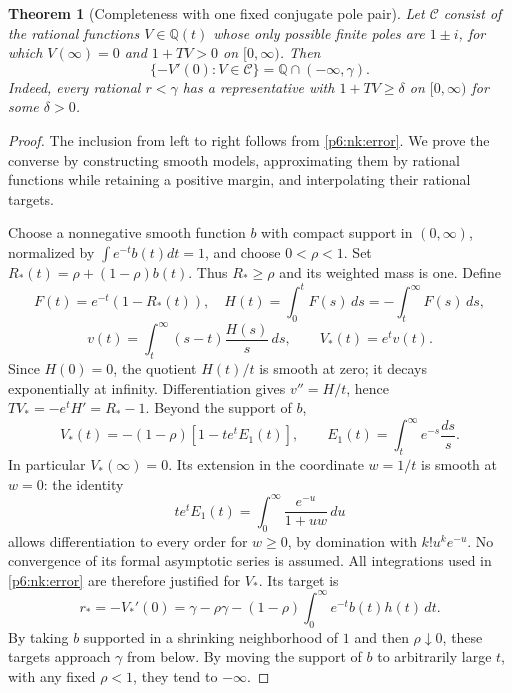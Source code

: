 \documentclass[11pt,a4paper]{article}
\newtheorem{theorem}{Theorem}[section]
\theoremstyle{definition}
\theoremstyle{remark}
\numberwithin{equation}{section}
\begin{document}
\begin{theorem}[Completeness with one fixed conjugate pole pair]
\label{p6:nk:complete}
Let $\mathcal C$ consist of the rational functions $V\in\mathbb Q(t)$
whose only possible finite poles are $1\pm i$, for which $V(\infty)=0$
and $1+TV>0$ on $[0,\infty)$. Then
\[
 \boxed{\{-V'(0):V\in\mathcal C\}=\mathbb Q\cap(-\infty,\gamma).}
\]
Indeed, every rational $r<\gamma$ has a representative with
$1+TV\geq\delta$ on $[0,\infty)$ for some $\delta>0$.
\end{theorem}
\begin{proof}
The inclusion from left to right follows from \eqref{p6:nk:error}. We prove
the converse by constructing smooth models, approximating them by rational
functions while retaining a positive margin, and interpolating their
rational targets.

Choose a nonnegative smooth function $b$ with compact support in
$(0,\infty)$, normalized by $\int e^{-t}b(t)dt=1$, and choose $0<\rho<1$.
Set $R_*(t)=\rho+(1-\rho)b(t)$. Thus $R_*\geq\rho$ and its weighted mass
is one. Define
\[
 F(t)=e^{-t}(1-R_*(t)),\quad
 H(t)=\int_0^tF(s)\,ds=-\int_t^\infty F(s)\,ds,
\]
\[
 v(t)=\int_t^\infty(s-t)\frac{H(s)}s\,ds,
 \qquad V_*(t)=e^t v(t).
\]
Since $H(0)=0$, the quotient $H(t)/t$ is smooth at zero; it decays
exponentially at infinity. Differentiation gives $v''=H/t$, hence
$TV_*=-e^tH'=R_*-1$. Beyond the support of $b$,
\begin{equation}
 V_*(t)=-(1-\rho)[1-t e^tE_1(t)],\qquad
 E_1(t)=\int_t^\infty e^{-s}\frac{ds}{s}.
 \label{p6:nk:tail}
\end{equation}
In particular $V_*(\infty)=0$. Its extension in the coordinate $w=1/t$
is smooth at $w=0$: the identity
\[
 t e^tE_1(t)=\int_0^\infty\frac{e^{-u}}{1+uw}\,du
\]
allows differentiation to every order for $w\geq0$, by domination with
$k!u^ke^{-u}$. No convergence of its formal asymptotic series is assumed.
All integrations used in \eqref{p6:nk:error} are therefore justified for
$V_*$. Its target is
\begin{equation}
 r_*=-V_*'(0)=\gamma-\rho\gamma
       -(1-\rho)\int_0^\infty e^{-t}b(t)h(t)\,dt.
 \label{p6:nk:modeltarget}
\end{equation}
By taking $b$ supported in a shrinking neighborhood of $1$ and then
$\rho\downarrow0$, these targets approach $\gamma$ from below. By moving
the support of $b$ to arbitrarily large $t$, with any fixed $\rho<1$,
they tend to $-\infty$.


\end{proof}
\end{document}

